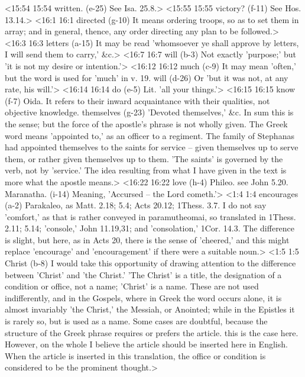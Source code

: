 <15:54 15:54  written. (e-25)  See Isa. 25.8.>
<15:55 15:55  victory? (f-11)  See Hos. 13.14.>
<16:1 16:1  directed (g-10)  It means ordering troops, so as to set them in array; and in  general, thence, any order directing any plan to be followed.>
<16:3 16:3  letters (a-15)  It may be read 'whomsoever ye shall approve by letters, I  will send them to carry,' &c.>
<16:7 16:7  will (b-3)  Not exactly 'purpose;' but 'it is not my desire or  intention.'>
<16:12 16:12  much (c-9)  It may mean 'often,' but the word is used for 'much' in v. 19.
  will (d-26)  Or 'but it was not, at any rate, his will.'>
<16:14 16:14  do (e-5)  Lit. 'all your things.'>
<16:15 16:15  know (f-7)  Oida. It refers to their inward acquaintance with their  qualities, not objective knowledge.
  themselves (g-23)  'Devoted themselves,' &c. In sum this is the sense; but the  force of the apostle's phrase is not wholly given. The Greek  word means 'appointed to,' as an officer to a regiment. The  family of Stephanas had appointed themselves to the saints for  service -- given themselves up to serve them, or rather given  themselves up to them. 'The saints' is governed by the verb,  not by 'service.' The idea resulting from what I have given in  the text is more what the apostle means.>
<16:22 16:22  love (h-4)  Phileo. see John 5.20.
  Maranatha. (i-14)  Meaning, 'Accursed -- the Lord cometh.'>
<1:4 1:4  encourages (a-2)  Parakaleo, as Matt. 2.18; 5.4; Acts 20.12; 1Thess. 3.7. I  do not say 'comfort,' as that is rather conveyed in  paramutheomai, so translated in 1Thess. 2.11; 5.14;  'console,' John 11.19,31; and 'consolation,' 1Cor. 14.3. The  difference is slight, but here, as in Acts 20, there is the  sense of 'cheered,' and this might replace 'encourage' and  'encouragement' if there were a suitable noun.>
<1:5 1:5  Christ (b-8)  I would take this opportunity of drawing attention to the  difference between 'Christ' and 'the Christ.' 'The Christ' is a  title, the designation of a condition or office, not a name;  'Christ' is a name. These are not used indifferently, and in  the Gospels, where in Greek the word occurs alone, it is almost  invariably 'the Christ,' the Messiah, or Anointed; while in the  Epistles it is rarely so, but is used as a name. Some cases are  doubtful, because the structure of the Greek phrase requires or  prefers the article. this is the case here. However, on the  whole I believe the article should be inserted here in English.  When the article is inserted in this translation, the office or  condition is considered to be the prominent thought.>
